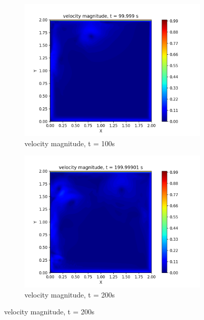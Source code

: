 \pagebreak


\begin{figure}

    \begin{subfigure}{0.5\textwidth}
       \centering
        \includegraphics[scale=0.5]{supporting_documents/contours/velocity-magnitude/velocityMagnitude_0000000100.png}
        \caption{velocity magnitude, t = 100s}
    \end{subfigure}
    \hfill
    \begin{subfigure}{0.5\textwidth}
       \centering
        \includegraphics[scale=0.5]{supporting_documents/contours/velocity-magnitude/velocityMagnitude_0000000200.png}
        \caption{velocity magnitude, t = 200s}

\end{subfigure}
\end{figure}
